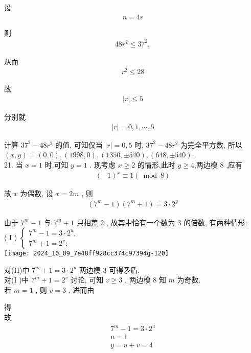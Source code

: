 设
\begin{align*}
	n=4 r
\end{align*}

则
\begin{align*}
	48 r^{2} \leqslant 37^{2},
\end{align*}

从而
\begin{align*}
	r^{2} \leqslant 28
\end{align*}

故
\begin{align*}
	|r| \leqslant 5
\end{align*}

分别就
\begin{align*}
	|r|=0,1, \cdots, 5
\end{align*}

计算 $37^{2}-48 r^{2}$ 的值, 可知仅当 $|r|=0,5$ 时,  $37^{2}-48 r^{2}$ 为完全平方数, 所以 $(x, y)=(0,0),(1998,0),(1350, \pm 540),(648, \pm 540)$.\\
21. 当 $x=1$ 时,可知 $y=1$ . 现考虑 $x \geqslant 2$ 的情形,此时 $y \geqslant 4$,两边模 8 ,应有
\begin{align*}
	(-1)^{x} \equiv 1(\bmod 8)
\end{align*}

故 $x$ 为偶数, 设 $x=2 m$ , 则
\begin{align*}
	\left(7^{m}-1\right)\left(7^{m}+1\right)=3 \cdot 2^{y}
\end{align*}

由于 $7^{m}-1$ 与 $7^{m}+1$ 只相差 2 , 故其中恰有一个数为 3 的倍数, 有两种情形: \\
( I ) $\left\{\begin{array}{l}7^{m}-1=3 \cdot 2^{u} ,  \\ 7^{m}+1=2^{v} ;\end{array}\right.$\\
\texttt{[image: 2024\_10\_09\_7e48ff928cc374c97394g-120]}

对(II)中 $7^{m}+1=3 \cdot 2^{u}$ 两边模 3 可得矛盾. \\
对(I )中 $7^{m}+1=2^{v}$ 讨论, 可知 $v \geqslant 3$ , 两边模 8 知 $m$ 为奇数. \\
若 $m=1$ , 则 $v=3$ , 进而由

得\\
故
\begin{align*}
	\begin{gathered}
		7^{m}-1=3 \cdot 2^{u} \\
		u=1 \\
		y=u+v=4
	\end{gathered}
\end{align*}


